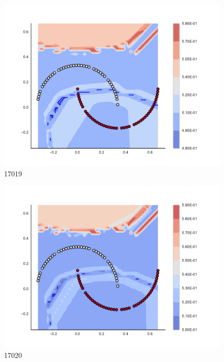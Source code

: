 \begin{subfigure}[b]{0.09\textwidth}
    \includegraphics[clip, trim=2.35cm 1.75cm 4.5cm 0cm,width=\textwidth]{img/convergence/17019.pdf}
    \caption{17019}
    \label{fig:convergence_17019}
\end{subfigure}
%
\begin{subfigure}[b]{0.09\textwidth}
    \includegraphics[clip, trim=2.35cm 1.75cm 4.5cm 0cm,width=\textwidth]{img/convergence/17020.pdf}
    \caption{17020}
    \label{fig:convergence_17020}
\end{subfigure}
%
